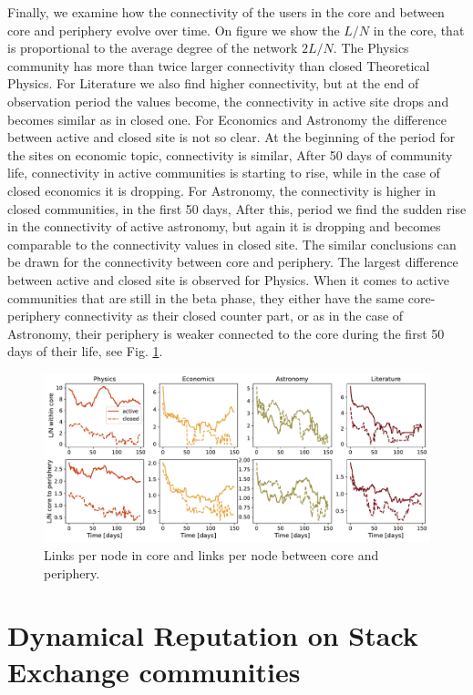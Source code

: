 Finally, we examine how the connectivity of the users in the core and between core and periphery evolve over time. On figure we show the $L/N$ in the core, that is proportional to the average degree of the network $2L/N$. The Physics community has more than twice larger connectivity than closed Theoretical Physics. For Literature we also find higher connectivity, but at the end of observation period the values become, the connectivity in active site drops and becomes similar as in closed one. For Economics and Astronomy the difference between active and closed site is not so clear. At the beginning of the period for the sites on economic topic, connectivity is similar, After 50 days of community life, connectivity in active communities is starting to rise, while in the case of closed economics it is dropping. For Astronomy, the connectivity is higher in closed communities, in the first 50 days, After this, period we find the sudden rise in the connectivity of active astronomy, but again it is dropping and becomes comparable to the connectivity values in closed site. The similar conclusions can be drawn for the connectivity between core and periphery. The largest difference between active and closed site is observed for Physics.  When it comes to active communities that are still in the beta phase, they either have the same core-periphery connectivity as their closed counter part, or as in the case of Astronomy, their periphery is weaker connected to the core during the first 50 days of their life, see Fig. \ref{fig:links_per_node}. 

\begin{figure}[h]
	\centering
	\includegraphics[width=\linewidth]{figures/stackexchange/core_connectivity.pdf}
	\caption{Links per node in core and links per node between core and periphery.}
	\label{fig:links_per_node}
\end{figure}

\section{Dynamical Reputation on Stack Exchange communities}

